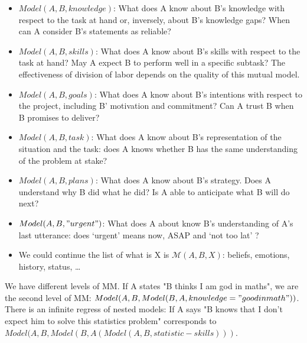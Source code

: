\documentclass{report}
\begin{document}
\begin{itemize}

    \item $Model(A,B, knowledge)$: What does A know about B's knowledge with
        respect to the task at hand or, inversely, about B's knowledge gaps?
        When can A consider B's statements as reliable? 

    \item $Model(A,B, skills)$: What does A know about B's skills with respect to
        the task at hand? May A expect B to perform well in a specific subtask?
        The effectiveness of division of labor depends on the quality of this
        mutual model. 

    \item $Model(A,B, goals)$: What does A know about B's intentions with respect
        to the project, including B' motivation and commitment? Can A trust B
        when B promises to deliver? 

    \item $Model(A,B, task)$: What does A know about B's representation of the
        situation and the task: does A knows whether B has the same
        understanding of the problem at stake? 

    \item $Model(A,B, plans)$: What does A know about B's strategy. Does A
        understand why B did what he did? Is A able to anticipate what B will do
        next? 

    \item $Model(A,B, "urgent")$: What does A about know B's understanding of A's
        last utterance: does ‘urgent’ means now, ASAP and ‘not too lat’ ?

    \item We could continue the list of what is X is $\mathcal{M}(A,B,X)$: beliefs,
        emotions, history, status, …

\end{itemize}

We have different levels of MM. If A states "B thinks I am god in maths", we
are the second level of MM:  $Model(A, B, Model(B,A, knowledge="good in
math"))$. There is an infinite regress of nested models: If A says "B knows that
I don't expect him to solve this statistics problem" corresponds to $Model(A, B,
Model (B, A (Model (A,B, statistic-skills)))$.
\end{document}
